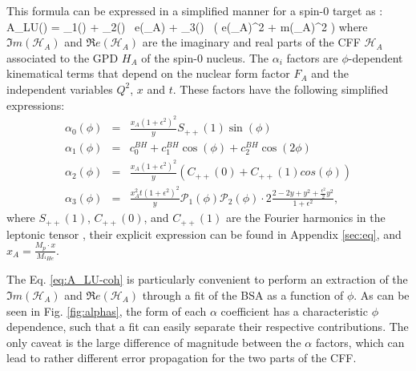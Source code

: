 \documentclass{article}
\let\oldequation\equation
\let\oldendequation\endequation
\renewenvironment{equation}
  {\linenomathNonumbers\oldequation}
  {\oldendequation\endlinenomath}
\begin{document}
This formula can be expressed in a simplified manner for a spin-0 target as \cite{Belitsky:2008bz}:
\begin{equation}
A_{LU}(\phi) = 
{\alpha_{1}(\phi) + \alpha_{2}(\phi) \, \Re e(_{A}) + \alpha_{3}(\phi) \, 
\big( 
\Re e(_{A})^{2} + \Im m(_{A})^{2} \big)}
\label{eq:A_LU-coh}
\end{equation}
where $\Im m(\mathcal{H}_{A})$ and $\Re e(\mathcal{H}_{A})$ are the imaginary 
and real parts of the CFF $\mathcal{H}_{A}$ associated to the GPD $H_A$ of the 
spin-0 nucleus. The 
$\alpha_{i}$ factors are $\phi$-dependent kinematical terms that depend on the 
nuclear form factor $F_A$ and the independent variables $Q^2$, $x$ and $t$.  
These factors have the following simplified expressions:
\begin{eqnarray}
	\label{eq:alpha1}
   \alpha_0 (\phi) & = &\frac{x_{A}(1+\epsilon^2)^2}{y} S_{++}(1) \sin(\phi)\\
    \alpha_1 (\phi) & = & c_0^{BH}+c_1^{BH} \cos({\phi})+c_2^{BH} \cos(2\phi)\\ 
   \alpha_2 (\phi) & = & \frac{x_{A}(1+\epsilon^2)^2}{y}  \left( C_{++}(0) +  
C_{++}(1) cos(\phi) \right)\\
\alpha_3 (\phi) &=& \frac{x^{2}_{A}t(1+\epsilon^2)^2}{y} {\mathcal P}_1(\phi) 
{\mathcal P}_2(\phi) \cdot 2 \frac{2-2y+y^2 + \frac{\epsilon^2}{2}y^2}{1 + 
\epsilon^2},
	\label{eq:alpha4}
\end{eqnarray}
where $S_{++}(1)$, $C_{++}(0)$, and $C_{++}(1)$ are the Fourier harmonics in the 
leptonic tensor \cite{Belitsky:2008bz}, their explicit expression can be found in 
Appendix \ref{sec:eq}, and $x_{A} = \frac{M_{p}\cdot x}{M_{^4\!He}}$. 

The Eq. \ref{eq:A_LU-coh} is particularly convenient to perform an extraction of 
the $\Im m(\mathcal{H}_{A})$ and $\Re e(\mathcal{H}_{A})$ through a fit of the BSA as 
a function of $\phi$. As can be seen in Fig. \ref{fig:alphas}, the form of each 
$\alpha$ coefficient has a characteristic $\phi$ dependence, such that a fit can
easily separate their respective contributions. The only caveat
is the large difference of magnitude between the $\alpha$ factors, which can lead to 
rather different error propagation for the two parts of the CFF.
\end{document}

